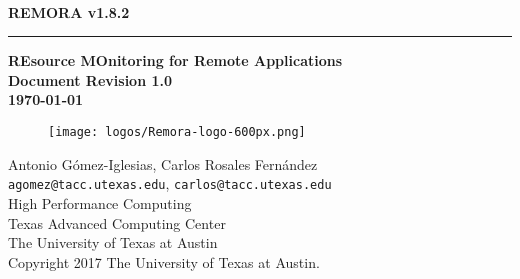 \documentclass[10pt,a4paper]{report}
\begin{document}
\begin{titlepage}
\thispagestyle{empty}	%
\verb+ +
\vspace{1em}
\begin{flushright}
\huge\bf REMORA v1.8.2\\
\rule{\textwidth}{4pt}
\large{\bf REsource MOnitoring for Remote Applications\\
Document Revision 1.0\\
\today}
\end{flushright}

\begin{figure}[ht!]
	\centering
	\texttt{[image: logos/Remora-logo-600px.png]}
\end{figure}

\newpage
\thispagestyle{empty}
\begin{flushleft}
Antonio G\'omez-Iglesias, Carlos Rosales Fern\'andez \\
\verb+agomez@tacc.utexas.edu+, \verb+carlos@tacc.utexas.edu+\\
\vspace{0.5em}
High Performance Computing \\
Texas Advanced Computing Center\\
The University of Texas at Austin\\
\vspace{1cm}
Copyright 2017 The University of Texas at Austin.
\end{flushleft}
\newpage
\end{titlepage}
\end{document}
